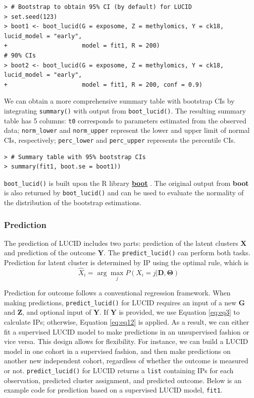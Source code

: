 \begin{verbatim}
> # Bootstrap to obtain 95% CI (by default) for LUCID
> set.seed(123)
> boot1 <- boot_lucid(G = exposome, Z = methylomics, Y = ck18, lucid_model = "early", 
+                     model = fit1, R = 200)
# 90% CIs
> boot2 <- boot_lucid(G = exposome, Z = methylomics, Y = ck18, lucid_model = "early", 
+                     model = fit1, R = 200, conf = 0.9)
\end{verbatim}

We can obtain a more comprehensive summary table with bootstrap CIs by
integrating \texttt{summary()} with output from \texttt{boot\_lucid()}. The resulting
summary table has 5 columns: \texttt{t0} corresponds to parameters estimated
from the observed data; \texttt{norm\_lower} and \texttt{norm\_upper} represent the
lower and upper limit of normal CIs, respectively; \texttt{perc\_lower} and
\texttt{perc\_upper} represents the percentile CIs.

\begin{verbatim}
> # Summary table with 95% bootstrap CIs
> summary(fit1, boot.se = boot1))
\end{verbatim}

\texttt{boot\_lucid()} is built upon the R library
\href{https://CRAN.R-project.org/package=boot}{\textbf{boot}} \citep{canty2021boot}.
The original output from \textbf{boot} is also returned by \texttt{boot\_lucid()} and
can be used to evaluate the normality of the distribution of the
bootstrap estimations.

\subsubsection{Prediction}\label{prediction}

The prediction of LUCID includes two parts: prediction of the latent
clusters \(\boldsymbol{\mathbf{X}}\) and prediction of the outcome
\(\boldsymbol{\mathbf{Y}}\). The \texttt{predict\_lucid()} can perform both tasks.
Prediction for latent cluster is determined by IP using the optimal
rule, which is
\[\hat{X}_i = \arg \max_j P(X_i = j| \boldsymbol{\mathbf{D}}, \boldsymbol{\mathbf{\Theta}})
    \label{eq21}   \label{eq:eq21}\]

Prediction for outcome follows a conventional regression framework. When
making predictions, \texttt{predict\_lucid()} for LUCID requires an input of a
new \(\boldsymbol{\mathbf{G}}\) and \(\boldsymbol{\mathbf{Z}}\), and
optional input of \(\boldsymbol{\mathbf{Y}}\). If
\(\boldsymbol{\mathbf{Y}}\) is provided, we use Equation \eqref{eq:eq3} to
calculate IPs; otherwise, Equation \eqref{eq:eq12} is applied. As a
result, we can either fit a supervised LUCID model to make predictions
in an unsupervised fashion or vice versa. This design allows for
flexibility. For instance, we can build a LUCID model in one cohort in a
supervised fashion, and then make predictions on another new independent
cohort, regardless of whether the outcome is measured or not.
\texttt{predict\_lucid()} for LUCID returns a \texttt{list} containing IPs for each
observation, predicted cluster assignment, and predicted outcome. Below
is an example code for prediction based on a supervised LUCID model,
\texttt{fit1}.


